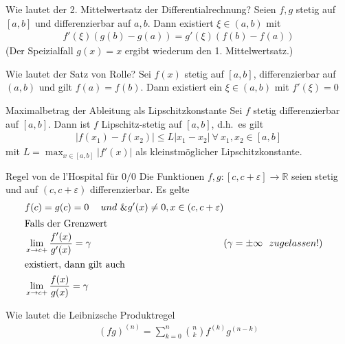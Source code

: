 \begin{karte}{Wie lautet der 2. Mittelwertsatz der Differentialrechnung?}
	Seien \(f, g\) stetig auf \([a,b]\) und differenzierbar auf \(a,b\). Dann existiert \(\xi\in(a,b)\) mit
	\begin{align}
		f'(\xi)(g(b)-g(a))=g'(\xi)(f(b)-f(a))
	\end{align}
	(Der Speizialfall \(g(x)=x\) ergibt wiederum den 1. Mittelwertsatz.)
\end{karte}



\begin{karte}{Wie lautet der Satz von Rolle?}
	Sei \(f(x)\) stetig auf \([a,b]\), differenzierbar auf \((a,b)\) und gilt \(f(a)=f(b)\). Dann existiert ein \(\xi \in (a,b) \) mit \(f'(\xi)=0\)
\end{karte}

\begin{karte}{Maximalbetrag der Ableitung als Lipschitzkonstante}
	Sei \(f\) stetig differenzierbar auf \([a,b]\). Dann ist \(f\) Lipschitz-stetig auf \([a,b]\), d.h.\ es gilt
	\begin{align}
		\lvert f(x_1)-f(x_2)\rvert \leq L\lvert x_1 - x_2\rvert \  \forall\  x_1,x_2 \in [a,b]
	\end{align}
	mit \(L=\displaystyle\max_{x\in[a,b]}\lvert f'(x)\rvert \) als kleinstmöglicher Lipschitzkonstante.

\end{karte}

\begin{karte}{Regel von de l'Hospital für \(0/0\)}
	Die Funktionen \(f,g:[c,c+\varepsilon]\to\mathbb{R}\) seien stetig und auf \((c,c+\varepsilon)\) differenzierbar. Es gelte
	\begin{align}
		  & f(c)=g(c)=0 & und\ \& g'(x) \neq 0, x \in(c,c+\varepsilon) &                                    &  \\
		\intertext{%
		Falls der Grenzwert}
		& \lim_{x\to c+}\frac{f'(x)}{g'(x)}=\gamma &        &(\gamma=\pm\infty\ \ zugelassen!)  \\
		\intertext{%
		existiert, dann gilt auch}
		& \lim_{x\to c+}\frac{f(x)}{g(x)}=\gamma   &        &
	\end{align}

\end{karte}

\begin{karte}{Wie lautet die Leibnizsche Produktregel}
	\begin{align}
		{(fg)}^{(n)}=\sum_{k=0}^{n} \binom{n}{k}f^{(k)}g^{(n-k)}
	\end{align}
\end{karte}
